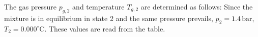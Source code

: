 The gas pressure \( p_{g,2} \) and temperature \( T_{g,2} \) are determined as follows:  
Since the mixture is in equilibrium in state 2 and the same pressure prevails, \( p_2 = 1.4 \, \text{bar} \), \( T_2 = 0.000^\circ\text{C} \). These values are read from the table.